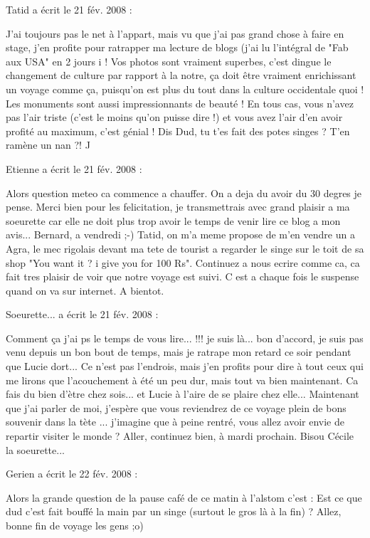 \medskip
Tatid a écrit le 21 fév. 2008 :
\begin{displayquote}
J'ai toujours pas le net à l'appart, mais vu que j'ai pas grand chose à faire en stage, j'en profite pour ratrapper ma lecture de blogs (j'ai lu l'intégral de "Fab aux USA" en 2 jours ^^) !
Vos photos sont vraiment superbes, c'est dingue le changement de culture par rapport à la notre, ça doit être vraiment enrichissant un voyage comme ça, puisqu'on est plus du tout dans la culture occidentale quoi ! Les monuments sont aussi impressionnants de beauté ! En tous cas, vous n'avez pas l'air triste (c'est le moins qu'on puisse dire !) et vous avez l'air d'en avoir profité au maximum, c'est génial !
Dis Dud, tu t'es fait des potes singes ? T'en ramène un nan ?! ^^
\end{displayquote}

\medskip
Etienne a écrit le 21 fév. 2008 :
\begin{displayquote}
Alors question meteo ca commence a chauffer. On a deja du avoir du 30 degres je pense. Merci bien pour les felicitation, je transmettrais avec grand plaisir a ma soeurette car elle ne doit plus trop avoir le temps de venir lire ce blog a mon avis...
Bernard, a vendredi ;-)
Tatid, on m'a meme propose de m'en vendre un a Agra, le mec rigolais devant ma tete de tourist a regarder le singe sur le toit de sa shop "You want it ? i give you for 100 Rs".
Continuez a nous ecrire comme ca, ca fait tres plaisir de voir que notre voyage est suivi. C est a chaque fois le suspense quand on va sur internet. A bientot.
\end{displayquote}

\medskip
Soeurette... a écrit le 21 fév. 2008 :
\begin{displayquote}
Comment ça j'ai ps le temps de vous lire... !!! je suis là... bon d'accord, je suis pas venu depuis un bon bout de temps, mais je ratrape mon retard ce soir pendant que Lucie dort...
Ce n'est pas l'endrois, mais j'en profits pour dire à tout ceux  qui me lirons que l'acouchement à été un peu dur, mais tout va bien maintenant. Ca fais du bien d'ètre chez sois... et Lucie à l'aire de se plaire chez elle...
Maintenant que j'ai parler de moi, j'espère que vous reviendrez de ce voyage plein de bons souvenir dans la tète ... j'imagine que à peine rentré, vous allez avoir envie de repartir visiter le monde ?
Aller, continuez bien, à mardi prochain.
Bisou
Cécile la soeurette...
\end{displayquote}

\medskip
Gerien a écrit le 22 fév. 2008 :
\begin{displayquote}
Alors la grande question de la pause café de ce matin à l'alstom c'est :
Est ce que dud c'est fait bouffé la main par un singe (surtout le gros là à la fin) ?
Allez, bonne fin de voyage les gens ;o)
\end{displayquote}

